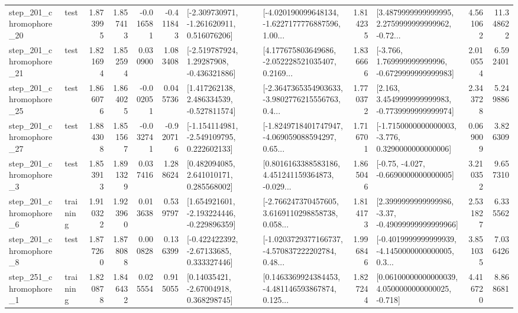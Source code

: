 \begin{tabular}{llrrrrllrlrr}
  step\_201\_chromophore\_20 &      test &      1.873995 &    1.857413 &     -0.016581 & -0.411843 &   [-2.309730971, -1.261620911, 0.516076206] &  [-4.020190099648134, -1.6227177776887596, 1.00... &       1.814235 &  [3.4879999999999995, 2.2759999999999962, -0.72... &            4.561062 &         11.348622 \\
  step\_201\_chromophore\_21 &      test &      1.821694 &    1.852594 &      0.030900 &  1.083408 &    [-2.519787924, 1.29287908, -0.436321886] &  [4.177675803649686, -2.052228521035407, 0.2169... &       1.836666 &   [-3.766, 1.769999999999996, -0.6729999999999983] &            2.010554 &          6.592401 \\
  step\_201\_chromophore\_25 &      test &      1.866076 &    1.864025 &     -0.002051 &  0.045736 &    [1.417262138, 2.486334539, -0.527811574] &  [-2.3647365354903633, -3.9802776215556763, 0.4... &       1.770372 &   [2.163, 3.4549999999999983, -0.7739999999999974] &            2.343728 &          5.249886 \\
  step\_201\_chromophore\_27 &      test &      1.884308 &    1.851567 &     -0.032741 & -0.920716 &   [-1.154114981, -2.549109795, 0.222602133] &  [-1.8249718401747947, -4.069059088594297, 0.65... &       1.716701 &  [-1.7150000000000003, -3.776, 0.3290000000000006] &            0.069009 &          3.826309 \\
   step\_201\_chromophore\_3 &      test &      1.853913 &    1.891329 &      0.037416 &  1.288624 &     [0.482094085, 2.641010171, 0.285568002] &  [0.8016163388583186, 4.451241159364873, -0.029... &       1.865046 &               [-0.75, -4.027, -0.6690000000000005] &            3.210352 &          9.657310 \\
   step\_201\_chromophore\_6 &  training &      1.910322 &    1.923960 &      0.013638 &  0.539797 &   [1.654921601, -2.193224446, -0.229896359] &  [-2.766247370457605, 3.6169110298858738, 0.058... &       1.814173 &  [2.3999999999999986, -3.37, -0.49099999999999966] &            2.531827 &          6.335562 \\
   step\_201\_chromophore\_8 &      test &      1.877260 &    1.878088 &      0.000828 &  0.136399 &    [-0.422422392, -2.67133685, 0.333327446] &  [-1.0203729377166737, -4.570837222202784, 0.48... &       1.996846 &  [-0.4019999999999939, -4.1450000000000005, 0.3... &            3.851035 &          7.036426 \\
   step\_251\_chromophore\_1 &  training &      1.820878 &    1.846432 &      0.025554 &  0.915055 &      [0.14035421, -2.67004918, 0.368298745] &  [0.1463369924384453, -4.481146593867874, 0.125... &       1.827244 &  [0.06100000000000039, 4.0500000000000025, -0.718] &            4.416720 &          8.868681 \\

\end{tabular}
